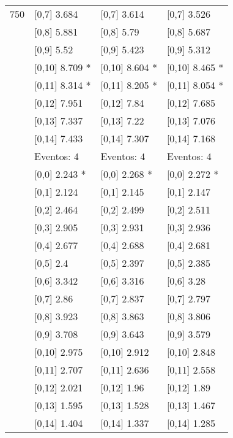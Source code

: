 \begin{table}
\begin{tabular}[t]{llll}
750 & {}[0,7] 3.684 & {}[0,7] 3.614 & {}[0,7] 3.526\\
\addlinespace
 & {}[0,8] 5.881 & {}[0,8] 5.79 & {}[0,8] 5.687\\
 & {}[0,9] 5.52 & {}[0,9] 5.423 & {}[0,9] 5.312\\
 & {}[0,10] 8.709 * & {}[0,10] 8.604 * & {}[0,10] 8.465 *\\
 & {}[0,11] 8.314 * & {}[0,11] 8.205 * & {}[0,11] 8.054 *\\
 & {}[0,12] 7.951 & {}[0,12] 7.84 & {}[0,12] 7.685\\
\addlinespace
 & {}[0,13] 7.337 & {}[0,13] 7.22 & {}[0,13] 7.076\\
 & {}[0,14] 7.433 & {}[0,14] 7.307 & {}[0,14] 7.168\\
 & Eventos:  4 & Eventos:  4 & Eventos:  4\\
 & {}[0,0] 2.243 * & {}[0,0] 2.268 * & {}[0,0] 2.272 *\\
 & {}[0,1] 2.124 & {}[0,1] 2.145 & {}[0,1] 2.147\\
\addlinespace
 & {}[0,2] 2.464 & {}[0,2] 2.499 & {}[0,2] 2.511\\
 & {}[0,3] 2.905 & {}[0,3] 2.931 & {}[0,3] 2.936\\
 & {}[0,4] 2.677 & {}[0,4] 2.688 & {}[0,4] 2.681\\
 & {}[0,5] 2.4 & {}[0,5] 2.397 & {}[0,5] 2.385\\
 & {}[0,6] 3.342 & {}[0,6] 3.316 & {}[0,6] 3.28\\
\addlinespace
1000 & {}[0,7] 2.86 & {}[0,7] 2.837 & {}[0,7] 2.797\\
 & {}[0,8] 3.923 & {}[0,8] 3.863 & {}[0,8] 3.806\\
 & {}[0,9] 3.708 & {}[0,9] 3.643 & {}[0,9] 3.579\\
 & {}[0,10] 2.975 & {}[0,10] 2.912 & {}[0,10] 2.848\\
 & {}[0,11] 2.707 & {}[0,11] 2.636 & {}[0,11] 2.558\\
\addlinespace
 & {}[0,12] 2.021 & {}[0,12] 1.96 & {}[0,12] 1.89\\
 & {}[0,13] 1.595 & {}[0,13] 1.528 & {}[0,13] 1.467\\
 & {}[0,14] 1.404 & {}[0,14] 1.337 & {}[0,14] 1.285\\
\bottomrule
\end{tabular}
\end{table}
